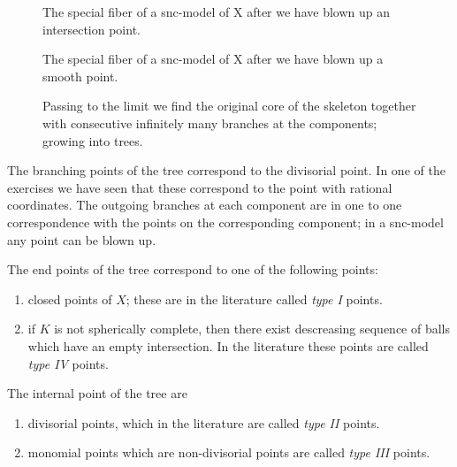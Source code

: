 \begin{center}
\begin{figure}[h]
\caption{ The special fiber of a snc-model of X after we have blown up an intersection point.}
\end{figure}
\end{center}

\begin{center}
\begin{figure}[h]
\caption{ The special fiber of a snc-model of X after we have blown up a smooth point.}
\end{figure}
\end{center}

\begin{center}
\begin{figure}[h]
\caption{Passing to the limit we find the original core of the skeleton together with consecutive infinitely many branches at the components; growing into trees.}
\end{figure}
\end{center}



The branching points of the tree correspond to the divisorial point. In one of the exercises we have seen that these correspond to the point with rational coordinates. The outgoing branches at each component are in one to one correspondence with the points on the corresponding component; in a snc-model any point can be blown up. 

The end points of the tree correspond to one of the following points:

\begin{enumerate}
 \item closed points of $X$; these are in the literature called \emph{type I} points. 
 \item if $K$ is not spherically complete, then there exist descreasing sequence of balls which have an empty intersection. In the literature these points are called \emph{type IV} points. 
\end{enumerate}

The internal point of the tree are 

\begin{enumerate}
 \item divisorial points, which in the literature are called \emph{type II} points.
 \item monomial points which are non-divisorial points are called \emph{type III} points.
\end{enumerate}


